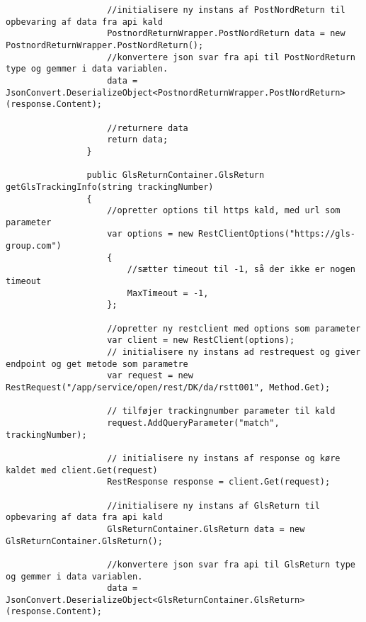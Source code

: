 \begin{verbatim}
                    //initialisere ny instans af PostNordReturn til opbevaring af data fra api kald
                    PostnordReturnWrapper.PostNordReturn data = new PostnordReturnWrapper.PostNordReturn();
                    //konvertere json svar fra api til PostNordReturn type og gemmer i data variablen.
                    data = JsonConvert.DeserializeObject<PostnordReturnWrapper.PostNordReturn>(response.Content);
        
                    //returnere data
                    return data;
                }
        
                public GlsReturnContainer.GlsReturn getGlsTrackingInfo(string trackingNumber)
                {
                    //opretter options til https kald, med url som parameter
                    var options = new RestClientOptions("https://gls-group.com")
                    {
                        //sætter timeout til -1, så der ikke er nogen timeout
                        MaxTimeout = -1,
                    };
        
                    //opretter ny restclient med options som parameter
                    var client = new RestClient(options);
                    // initialisere ny instans ad restrequest og giver endpoint og get metode som parametre
                    var request = new RestRequest("/app/service/open/rest/DK/da/rstt001", Method.Get);
        
                    // tilføjer trackingnumber parameter til kald
                    request.AddQueryParameter("match", trackingNumber);
        
                    // initialisere ny instans af response og køre kaldet med client.Get(request)
                    RestResponse response = client.Get(request);
        
                    //initialisere ny instans af GlsReturn til opbevaring af data fra api kald
                    GlsReturnContainer.GlsReturn data = new GlsReturnContainer.GlsReturn();
        
                    //konvertere json svar fra api til GlsReturn type og gemmer i data variablen.
                    data = JsonConvert.DeserializeObject<GlsReturnContainer.GlsReturn>(response.Content);
        

\end{verbatim}
